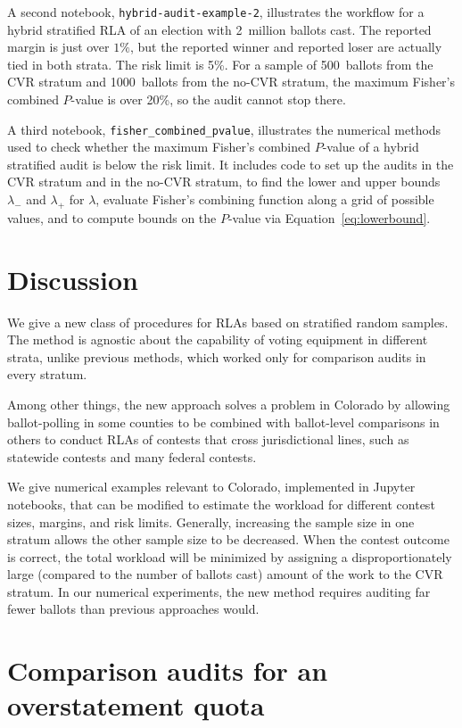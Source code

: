 \documentclass[runningheads]{llncs}
\begin{document}
A second notebook, \texttt{hybrid-audit-example-2}, illustrates the 
workflow for a hybrid stratified RLA of an election with 2~million ballots cast.
The reported margin is just over $1\%$, but the reported winner
and reported loser are actually tied in both strata.  
The risk limit is 5\%.
For a sample of 500~ballots from the CVR stratum and 1000~ballots from the no-CVR stratum, the maximum Fisher's combined $P$-value is over 20\%, so the audit cannot stop there.

A third notebook, \texttt{fisher\_combined\_pvalue}, illustrates the numerical methods used
to check whether the maximum Fisher's combined $P$-value of a hybrid stratified audit is below the risk limit.
It includes code to set up the audits in the CVR stratum and in the no-CVR stratum,
 to find the lower and upper bounds $\lambda_-$ and $\lambda_+$ for $\lambda$,
 evaluate Fisher's combining function along a grid of possible values,
and to compute bounds on the $P$-value via Equation~\ref{eq:lowerbound}.

\section{Discussion} \label{sec:discussion}

We give a new class of procedures for RLAs based on stratified random samples.
The method is agnostic about the capability of voting equipment in different strata, unlike
previous methods, which worked only for comparison audits in every stratum.

Among other things, the new approach solves a problem in Colorado by allowing ballot-polling in some counties to be combined with ballot-level comparisons in others to conduct RLAs of contests that cross jurisdictional lines, such as statewide contests and many federal contests.

We give numerical examples relevant to Colorado, implemented in Jupyter notebooks, that can be modified to estimate the workload for different contest sizes, margins, and risk limits.
Generally, increasing the sample size in one stratum allows the other sample size to be decreased.
When the contest outcome is correct, the total workload will be minimized by 
assigning a disproportionately large (compared to the number of ballots cast) amount of 
the work to the CVR stratum.
In our numerical experiments, the new method requires auditing far fewer ballots than previous approaches would. 

\appendix
\section{Comparison audits for an overstatement quota}\label{sec:appendix-comparison}
\end{document}

